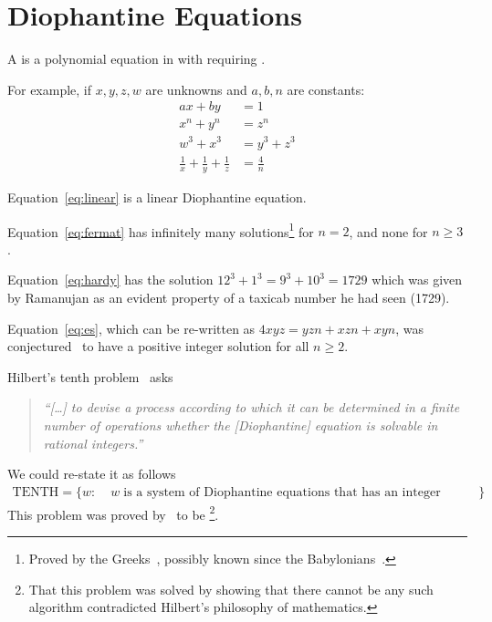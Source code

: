 \documentclass[a4paper]{report}
\newcommand{\bookref}[3]{\marginpar{\faBook{}~#1\\Chapter #2\\Section #3}}
\theoremstyle{definition}
\begin{document}
\section{Diophantine Equations}
\bookref{ER}{28}{28.7.8}
A  is a polynomial equation in  with  requiring .

For example, if $x, y, z, w$ are unknowns and $a, b, n$ are constants:
\begin{align}
ax + by &= 1\label{eq:linear}\\
x^n + y^n &= z^n\label{eq:fermat}\\
w^3 + x^3 &= y^3 + z^3\label{eq:hardy}\\
\frac{1}{x} + \frac{1}{y} + \frac{1}{z} &= \frac{4}{n}\label{eq:es}
\end{align}

Equation~\eqref{eq:linear} is a linear Diophantine equation.

Equation~\eqref{eq:fermat} has infinitely many solutions\footnote{Proved by the Greeks~\citep{Heath:1956:TBE:1096890}, possibly known since the Babylonians~\citep{ROBSON2001167}.} for $n = 2$,
and none for $n \geq 3$ \citep{diophantus-et-al-1670,wiles1995modular}.

Equation~\eqref{eq:hardy} has the solution $12^3 + 1^3 = 9^3 + 10^3 = 1729$ which was given by Ramanujan as an evident property of a taxicab number he had seen (1729).

Equation~\eqref{eq:es}, which can be re-written as $4xyz = yzn + xzn + xyn$, was conjectured~\citep{erdos-1950} to have a positive integer solution for all $n \geq 2$. %

Hilbert's tenth problem~\citep{hilbert1902mathematical} asks
%
\begin{quote}
{\em ``[\dots{}] to devise a process according to which it can be determined in a finite number of operations whether the [Diophantine] equation is solvable in rational integers.''}
\end{quote}
%
We could re-state it as follows
%
\begin{align*}
\text{TENTH} = \{ w : & \; w \; \text{is a system of Diophantine equations that has an integer solution} \}
\end{align*}
%
This problem was proved by~\citet{matiyasevich1970diophantineness} to be \footnote{That this problem was solved by showing that there cannot be any such algorithm contradicted Hilbert's philosophy of mathematics.}.
\end{document}
